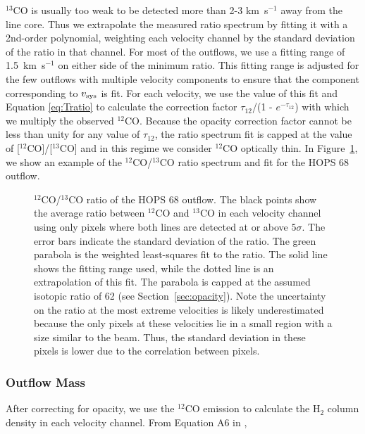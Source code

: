 \documentclass[twocolumn]{aastex63}
\newcommand{\example}{HOPS 68}
\newcommand{\kms}{km~s$^{-1}$}
\newcommand{\co}[1][]{\ensuremath{^{#1}}CO}
\begin{document}
\co[13]{} is usually too weak to be detected more than 2-3 \kms{} away from the line core. Thus we extrapolate the measured ratio spectrum by fitting it with a 2nd-order polynomial, weighting each velocity channel by the standard deviation of the ratio in that channel. For most of the outflows, we use a fitting range of 1.5~\kms{} on either side of the minimum ratio. This fitting range is adjusted for the few outflows with multiple velocity components to ensure that the component corresponding to $v_{\rm sys}$ is fit. For each velocity, we use the value of this fit and Equation \ref{eq:Tratio} to calculate the correction factor $\tau_{12}$/(1 - $e^{-\tau_{12}}$) with which we multiply the observed \co[12]{}. Because the opacity correction factor cannot be less than unity for any value of $\tau_{12}$, the ratio spectrum fit is capped at the value of [\co[12]]/[\co[13]] and in this regime we consider \co[12]{} optically thin. In Figure~\ref{fig:opacity}, we show an example of the \co[12]{}/\co[13]{} ratio spectrum and fit for the \example{} outflow. 

\begin{figure}
\caption{\co[12]{}/\co[13]{} ratio of the \example{} outflow. The black points show the average ratio between \co[12]{} and \co[13]{} in each velocity channel using only pixels where both lines are detected at or above $5\sigma$. The error bars indicate the standard deviation of the ratio. The green parabola is the weighted least-squares fit to the ratio. The solid line shows the fitting range used, while the dotted line is an extrapolation of this fit. The parabola is capped at the assumed isotopic ratio of 62 (see Section~\ref{sec:opacity}). Note the uncertainty on the ratio at the most extreme velocities is likely underestimated because the only pixels at these velocities lie in a small region with a size similar to the beam. Thus, the standard deviation in these pixels is lower due to the correlation between pixels.\label{fig:opacity}}
\end{figure}

\subsubsection{Outflow Mass}\label{sec:dmdv}
After correcting for opacity, we use the \co[12]{} emission to calculate the H$_2$ column density in each velocity channel. From Equation A6 in \citet{ZhangY16},
\end{document}
